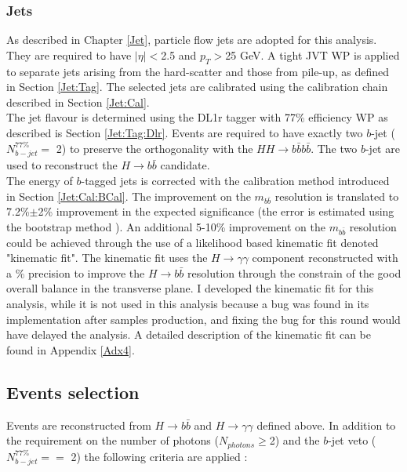 \subsubsection{Jets}
\label{HHyybb:ObjEvt:Obj:Jet}
As described in Chapter \ref{Jet}, particle flow jets are adopted for this analysis. They are required to have $|\eta| < $2.5 and $p_T > $25 GeV. A tight JVT WP is applied to separate jets arising from the hard-scatter and those from pile-up, as defined in Section \ref{Jet:Tag}. The selected jets are calibrated using the calibration chain described in Section \ref{Jet:Cal}. \\

The jet flavour is determined using the DL1r tagger with 77\% efficiency WP as described is Section \ref{Jet:Tag:Dlr}. Events are required to have exactly two $b$-jet ($N_{b-jet}^{77\%} = $ 2) to preserve the orthogonality with the $HH\to b\bar{b}b\bar{b}$. The two $b$-jet are used to reconstruct the $H\to b\bar{b}$ candidate. \\
The energy of $b$-tagged jets is corrected with the calibration method introduced in Section \ref{Jet:Cal:BCal}. The improvement on the $m_{b\bar{b}}$ resolution is translated to 7.2\%$\pm$2\% improvement in the expected significance (the error is estimated using the bootstrap method \cite{Bootstrap}). An additional 5-10\% improvement on the $m_{b\bar{b}}$ resolution could be achieved through the use of a likelihood based kinematic fit denoted "kinematic fit". The kinematic fit uses the $H\to\gamma\gamma$ component reconstructed with a \% precision to improve the $H\to b\bar{b}$ resolution through the constrain of the good overall balance in the transverse plane. I developed the kinematic fit for this \HHyybb analysis, while it is not used in this analysis because a bug was found in its implementation after samples production, and fixing the bug for this round would have delayed the analysis. A detailed description of the kinematic fit can be found in Appendix \ref{Adx4}. \\


\subsection{Events selection}
\label{HHyybb:ObjEvt:Evt}
Events are reconstructed from $H\to b\bar{b}$ and $H\to\gamma\gamma$ defined above. In addition to the requirement on the number of photons ($N_{photons} \geq $2) and the $b$-jet veto ($N_{b-jet}^{77\%} == $ 2) the following criteria are applied : 

